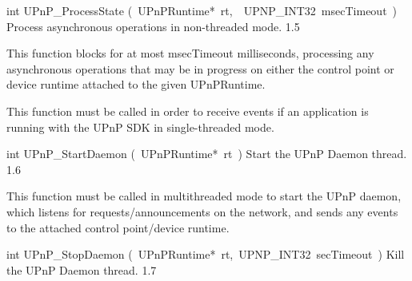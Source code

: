 \documentclass{article}
\begin{document}
\begin{cxxentry}
\begin{cxxfunction}
\begin{cxxdoc}
\end{cxxdoc}
\end{cxxfunction}
\begin{cxxfunction}
{int}
        {UPnP\_ProcessState}
        {(\ UPnPRuntime*\ rt,\ \ UPNP\_INT32\ msecTimeout\ )}
        {Process asynchronous operations in non-threaded mode. }
        {1.5}
\begin{cxxdoc}

This function blocks for at most msecTimeout milliseconds, processing
any asynchronous operations that may be in progress on either the
control point or device runtime attached to the given UPnPRuntime.

This function must be called in order to receive events if an
application is running with the UPnP SDK in single-threaded mode.


\end{cxxdoc}
\end{cxxfunction}
\begin{cxxfunction}
{int}
        {UPnP\_StartDaemon}
        {(\ UPnPRuntime*\ rt\ )}
        {Start the UPnP Daemon thread. }
        {1.6}
\begin{cxxdoc}

This function must be called in multithreaded mode to start the
UPnP daemon, which listens for requests/announcements on the network,
and sends any events to the attached control point/device runtime.


\end{cxxdoc}
\end{cxxfunction}
\begin{cxxfunction}
{int}
        {UPnP\_StopDaemon}
        {(\ UPnPRuntime*\ rt,\ UPNP\_INT32\ secTimeout\ )}
        {Kill the UPnP Daemon thread. }
        {1.7}
\begin{cxxdoc}


\end{cxxdoc}
\end{cxxfunction}
\end{cxxentry}
\end{document}
